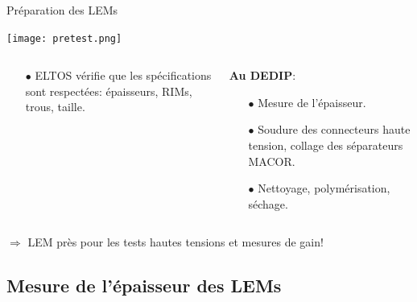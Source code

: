     \begin{frame}{Préparation des LEMs}
    	\begin{scriptsize}
    		\begin{center}
		    	\texttt{[image: pretest.png]}
	    	\end{center}
	    	\begin{columns}
	    		\begin{column}{0.5\textwidth}
	    			\begin{itemize}
	    				\item[$\bullet$] ELTOS vérifie que les spécifications sont respectées: épaisseurs, RIMs, trous, taille.
	    			\end{itemize}
	    		\end{column}\hfill
	    		\begin{column}{0.5\textwidth}
	    			\textbf{Au DEDIP}:
	    			\begin{itemize}
	    				\item[$\bullet$] Mesure de l'épaisseur.
	    				\item[$\bullet$] Soudure des connecteurs haute tension, collage des séparateurs MACOR.
	    				\item[$\bullet$] Nettoyage, polymérisation, séchage.
	    			\end{itemize}
	    		\end{column}
	    	\end{columns}
	    \end{scriptsize}
        $\Rightarrow$ LEM près pour les tests hautes tensions et mesures de gain!
    \end{frame}

    \subsection[Épaisseur]{Mesure de l'épaisseur des LEMs}


